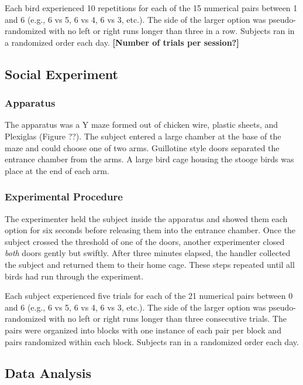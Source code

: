 \documentclass[
  ,doc,floatsintext]{apa6}
\begin{document}
Each bird experienced 10 repetitions for each of the 15 numerical pairs between 1 and 6 (e.g., 6 vs 5, 6 vs 4, 6 vs 3, etc.). The side of the larger option was pseudo-randomized with no left or right runs longer than three in a row. Subjects ran in a randomized order each day. \textbf{{[}Number of trials per session?{]}}

\hypertarget{social-experiment}{%
\subsection{Social Experiment}\label{social-experiment}}

\hypertarget{apparatus-1}{%
\subsubsection{Apparatus}\label{apparatus-1}}

The apparatus was a Y maze formed out of chicken wire, plastic sheets, and Plexiglas (Figure ??). The subject entered a large chamber at the base of the maze and could choose one of two arms. Guillotine style doors separated the entrance chamber from the arms. A large bird cage housing the stooge birds was place at the end of each arm.

\hypertarget{experimental-procedure-1}{%
\subsubsection{Experimental Procedure}\label{experimental-procedure-1}}

The experimenter held the subject inside the apparatus and showed them each option for six seconds before releasing them into the entrance chamber. Once the subject crossed the threshold of one of the doors, another experimenter closed \emph{both} doors gently but swiftly. After three minutes elapsed, the handler collected the subject and returned them to their home cage. These steps repeated until all birds had run through the experiment.

Each subject experienced five trials for each of the 21 numerical pairs between 0 and 6 (e.g., 6 vs 5, 6 vs 4, 6 vs 3, etc.). The side of the larger option was pseudo-randomized with no left or right runs longer than three consecutive trials. The pairs were organized into blocks with one instance of each pair per block and pairs randomized within each block. Subjects ran in a randomized order each day.

\hypertarget{data-analysis}{%
\subsection{Data Analysis}\label{data-analysis}}
\end{document}
